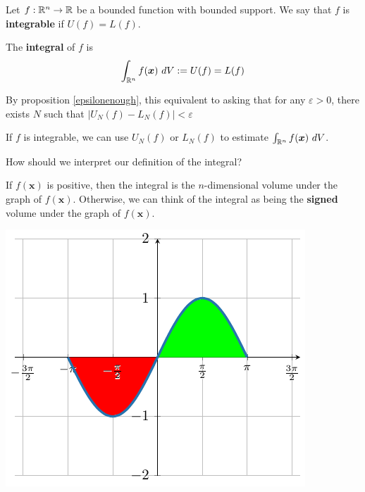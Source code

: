 \begin{definition}\label{def:integrable}
    Let $f: \mathbb{R}^n \to \mathbb{R}$ be a bounded function with bounded support.
    We say that $f$ is \textbf{integrable} if $U(f) = L(f)$.
    
    The \textbf{integral} of $f$ is $$\int_{\mathbb{R}^n} f(\bm{x}) \ dV := U(f) = L(f)$$

    By proposition \ref{epsilonenough}, this equivalent to asking that for any $\varepsilon > 0$,
    there exists $N$ such that $|U_N(f) - L_N(f)| < \varepsilon$
    \end{definition}

    

    
    \begin{corollary}
    If $f$ is integrable, we can use $U_N(f)$ or $L_N(f)$ to estimate $\int_{\R^n} f(\bm{x}) \ dV$. 
    \end{corollary}


\begin{motivating}
    How should we interpret our definition of the integral?
\end{motivating}

\begin{remark}
    If $f(\bm{x})$ is positive, then the integral is the $n$-dimensional volume under the graph of $f(\bm{x})$.  Otherwise, we can think of the integral as being the \textbf{signed} volume under the graph of $f(\bm{x})$.

    \begin{center}
        \includegraphics{chapters/4-IntegrationRn/figures/figures-signedvolume.pdf}
    \end{center}
\end{remark}

